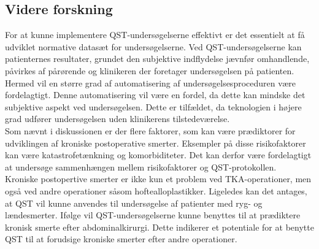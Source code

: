 \subsection{Videre forskning}
For at kunne implementere QST-undersøgelserne effektivt er det essentielt at få udviklet normative datasæt for undersøgelserne.  Ved QST-undersøgelserne kan patienternes resultater, grundet den subjektive indflydelse jævnfør  omhandlende, påvirkes af pårørende og klinikeren der foretager undersøgelsen på patienten. Hermed vil en større grad af automatisering af undersøgelsesproceduren være fordelagtigt. Denne automatisering vil være en fordel, da dette kan mindske det subjektive aspekt ved undersøgelsen. Dette er tilfældet, da teknologien i højere grad udfører undersøgelsen uden klinikerens tilstedeværelse. \\
Som nævnt i diskussionen er der flere faktorer, som kan være prædiktorer for udviklingen af kroniske postoperative smerter. Eksempler på disse risikofaktorer kan være katastrofetænkning og komorbiditeter. Det kan derfor være fordelagtigt at undersøge sammenhængen mellem risikofaktorer og QST-protokollen.\\
Kroniske postopertive smerter er ikke kun et problem ved TKA-operationer, men også ved andre operationer såsom hoftealloplastikker. \citep{Suokas2012} Ligeledes kan det antages, at QST vil kunne anvendes til undersøgelse af patienter med ryg- og lændesmerter. Ifølge  vil QST-undersøgelserne kunne benyttes til at prædiktere kronisk smerte efter abdominalkirurgi. Dette indikerer et potentiale for at benytte QST til at forudsige kroniske smerter efter andre operationer.